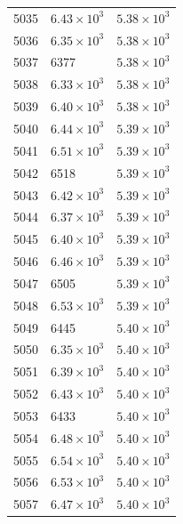 \begin{table}[H]
\begin{tabular}{lll}
5035 & $\displaystyle 6.43 \times 10^{3}$ & $\displaystyle 5.38 \times 10^{3}$ \\
5036 & $\displaystyle 6.35 \times 10^{3}$ & $\displaystyle 5.38 \times 10^{3}$ \\
5037 & 6377 & $\displaystyle 5.38 \times 10^{3}$ \\
5038 & $\displaystyle 6.33 \times 10^{3}$ & $\displaystyle 5.38 \times 10^{3}$ \\
5039 & $\displaystyle 6.40 \times 10^{3}$ & $\displaystyle 5.38 \times 10^{3}$ \\
5040 & $\displaystyle 6.44 \times 10^{3}$ & $\displaystyle 5.39 \times 10^{3}$ \\
5041 & $\displaystyle 6.51 \times 10^{3}$ & $\displaystyle 5.39 \times 10^{3}$ \\
5042 & 6518 & $\displaystyle 5.39 \times 10^{3}$ \\
5043 & $\displaystyle 6.42 \times 10^{3}$ & $\displaystyle 5.39 \times 10^{3}$ \\
5044 & $\displaystyle 6.37 \times 10^{3}$ & $\displaystyle 5.39 \times 10^{3}$ \\
5045 & $\displaystyle 6.40 \times 10^{3}$ & $\displaystyle 5.39 \times 10^{3}$ \\
5046 & $\displaystyle 6.46 \times 10^{3}$ & $\displaystyle 5.39 \times 10^{3}$ \\
5047 & 6505 & $\displaystyle 5.39 \times 10^{3}$ \\
5048 & $\displaystyle 6.53 \times 10^{3}$ & $\displaystyle 5.39 \times 10^{3}$ \\
5049 & 6445 & $\displaystyle 5.40 \times 10^{3}$ \\
5050 & $\displaystyle 6.35 \times 10^{3}$ & $\displaystyle 5.40 \times 10^{3}$ \\
5051 & $\displaystyle 6.39 \times 10^{3}$ & $\displaystyle 5.40 \times 10^{3}$ \\
5052 & $\displaystyle 6.43 \times 10^{3}$ & $\displaystyle 5.40 \times 10^{3}$ \\
5053 & 6433 & $\displaystyle 5.40 \times 10^{3}$ \\
5054 & $\displaystyle 6.48 \times 10^{3}$ & $\displaystyle 5.40 \times 10^{3}$ \\
5055 & $\displaystyle 6.54 \times 10^{3}$ & $\displaystyle 5.40 \times 10^{3}$ \\
5056 & $\displaystyle 6.53 \times 10^{3}$ & $\displaystyle 5.40 \times 10^{3}$ \\
5057 & $\displaystyle 6.47 \times 10^{3}$ & $\displaystyle 5.40 \times 10^{3}$ \\

\end{tabular}
\end{table}
